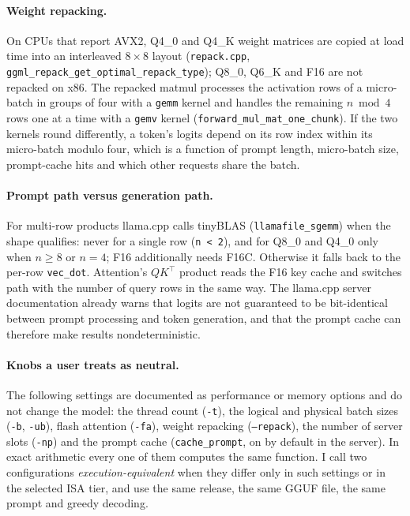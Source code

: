 \paragraph{Weight repacking.}
On CPUs that report AVX2, Q4\_0 and Q4\_K weight matrices are copied at load time into an
interleaved $8\times8$ layout (\texttt{repack.cpp},
\texttt{ggml\_repack\_get\_optimal\_repack\_type}); Q8\_0, Q6\_K and F16 are not repacked on
x86. The repacked matmul processes the activation rows of a micro-batch in groups of four with
a \texttt{gemm} kernel and handles the remaining $n \bmod 4$ rows one at a time with a
\texttt{gemv} kernel (\texttt{forward\_mul\_mat\_one\_chunk}). If the two kernels round
differently, a token's logits depend on its row index within its
micro-batch modulo four, which is a function of prompt length, micro-batch size, prompt-cache
hits and which other requests share the batch.

\paragraph{Prompt path versus generation path.}
For multi-row products llama.cpp calls tinyBLAS (\texttt{llamafile\_sgemm}) when the
shape qualifies: never for a single row (\texttt{n < 2}), and for Q8\_0 and Q4\_0 only when
$n \ge 8$ or $n = 4$; F16 additionally needs F16C. Otherwise it falls back to the per-row
\texttt{vec\_dot}. Attention's $QK^\top$ product reads the F16 key cache and switches path
with the number of query rows in the same way. The llama.cpp server documentation already warns
that logits are not guaranteed to be bit-identical between prompt processing and token
generation, and that the prompt cache can therefore make results nondeterministic.

\paragraph{Knobs a user treats as neutral.}
The following settings are documented as performance or memory options and do not change the
model: the thread count (\texttt{-t}), the logical and physical batch sizes (\texttt{-b},
\texttt{-ub}), flash attention (\texttt{-fa}), weight repacking (\texttt{--repack}), the number
of server slots (\texttt{-np}) and the prompt cache (\texttt{cache\_prompt}, on by default in the
server). In exact arithmetic every one of them computes the same function. I call two
configurations \emph{execution-equivalent} when they differ only in such settings or in the
selected ISA tier, and use the same release, the same GGUF file, the same prompt and greedy
decoding.
